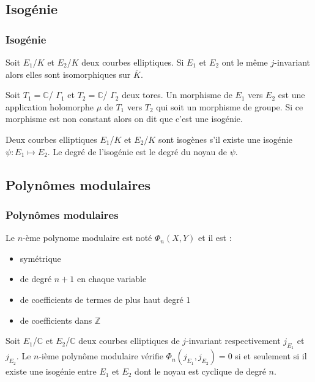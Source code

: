 \documentclass{beamer}
\begin{document}
\subsection{Isogénie}
\begin{frame}
\frametitle{Isogénie}
\begin{definition}
Soit $E_1$/$K$ et $E_2$/$K$ deux courbes elliptiques. Si $E_1$ et $E_2$ ont le même $j$-invariant alors elles sont isomorphiques sur $\bar{K}$. 
\end{definition}

\begin{definition}
Soit $T_1=\mathbb{C}$/ $\Gamma_1$ et $T_2 = \mathbb{C}$/ $\Gamma_2$ deux tores. Un morphisme de $E_1$ vers $E_2$ est une application holomorphe $\mu$ de $T_1$ vers $T_2$ qui soit un morphisme de groupe. Si ce morphisme est non constant alors on dit que c'est une isogénie.
\end{definition}

Deux courbes elliptiques $E_1$/$K$ et $E_2$/$K$ sont isogènes s'il existe une isogénie $\psi : E_1 \mapsto E_2$. Le degré de l’isogénie est le degré du noyau de $\psi$.


\end{frame}
\subsection{Polynômes modulaires}
\begin{frame}
\frametitle{Polynômes modulaires}
Le $n$-ème polynome modulaire est noté $\Phi_n(X,Y)$ et il est :
\begin{itemize}
\item symétrique 
\item de degré $n+1$ en chaque variable
\item de coefficients de termes de plus haut degré $1$
\item de coefficients dans $\mathbb{Z}$
\end{itemize}
\begin{definition}
Soit $E_1$/$\mathbb{C}$ et $E_2$/$\mathbb{C}$ deux courbes elliptiques de $j$-invariant respectivement $j_{E_1}$ et $j_{E_2}$. Le $n$-ième polynôme modulaire vérifie $\Phi_n(j_{E_1},j_{E_2}) = 0$ si et seulement si il existe une isogénie entre $E_1$ et $E_2$ dont le noyau est cyclique de degré $n$.
\end{definition}


\end{frame}
\end{document}
